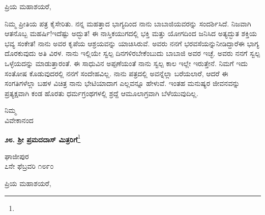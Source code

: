 \noindent
ಪ್ರಿಯ ಮಹಾಶಯರೆ,

ನಿಮ್ಮ ಪ್ರೀತಿಯ ಪತ್ರ ಕೈಸೇರಿತು. ನನ್ನ ಮಹತ್ತಾದ ಭಾಗ್ಯದಿಂದ ನಾನು ಬಾಬಾಜಿಯವರನ್ನು ಸಂದರ್ಶಿಸಿದೆ. ನಿಜವಾಗಿ ಆತನೊಬ್ಬ ಮಹರ್ಷಿ!ಇದೆಷ್ಟು ಅದ್ಭುತ! ಈ ನಾಸ್ತಿಕಯುಗದಲ್ಲಿ ಭಕ್ತಿ ಮತ್ತು ಯೋಗದಿಂದ ಜನಿಸಿದ ಅತ್ಯದ್ಭುತ ಶಕ್ತಿಯ ಭವ್ಯ ಸಂಕೇತ! ನಾನು ಅವರ ಕೃಪೆಯ ಆಶ್ರಯವನ್ನು ಯಾಚಿಸಿರುವೆ. ಅವರು ನನಗೆ ಭರವಸೆಯನ್ನು\break ನೀಡಿದ್ದಾರೆ\enginline{-}ಈ ಭಾಗ್ಯ ದೊರಕುವುದು ಅತಿ ವಿರಳ. ನಾನು ಇಲ್ಲಿಯೇ ಸ್ವಲ್ಪ ದಿನಗಳಿರಬೇಕೆಂಬುದು ಬಾಬಾಜಿ ಅವರ ಇಚ್ಛೆ. ಅವರು ನನಗೆ ಸ್ವಲ್ಪ ಒಳ್ಳೆಯದನ್ನು ಮಾಡುತ್ತಾರಂತೆ. ಈ ಸಾಧುವಿನ ಅಪ್ಪಣೆಯಂತೆ ನಾನು ಸ್ವಲ್ಪ ಕಾಲ ಇಲ್ಲೇ ಇರುತ್ತೇನೆ. ನಿಮಗೆ ಇದು ಸಂತೋಷ ಕೊಡುವುದರಲ್ಲಿ ನನಗೆ ಸಂದೇಹವಿಲ್ಲ. ನಾನು ಪತ್ರದಲ್ಲಿ ಅವನ್ನೆಲ್ಲಾ ಬರೆಯಲಾರೆ, ಆದರೆ ಈ ಸಂಗತಿಗಳೆಲ್ಲಾ ಬಹಳ ವಿಚಿತ್ರ \enginline{-} ನಾನು ಭೇಟಿಯಾದಾಗ ಎಲ್ಲವನ್ನೂ ಹೇಳುವೆ. ಇಂತಹ ಮನುಷ್ಯರ ಜೀವನವನ್ನು ಪ್ರತ್ಯಕ್ಷವಾಗಿ ಕಂಡ ಹೊರತು ಧರ್ಮಗ್ರಂಥಗಳಲ್ಲಿ ಶ್ರದ್ದೆ ಆಮೂಲಾಗ್ರವಾಗಿ ಬೆಳೆಯುವುದಿಲ್ಲ.

\vspace{-0.5cm}

{\flushright
ನಿಮ್ಮ\\ವಿವೇಕಾನಂದ\par}

\begin{center}
\textbf{೨೮. ಶ‍್ರೀ ಪ್ರಮದದಾಸ್ ಮಿತ್ರರಿಗೆ}\footnote{}
\end{center}

\vspace{-0.5cm}

\begin{flushright}
ಘಾಜೀಪುರ\\೭ನೇ ಫೆಬ್ರವರಿ ೧೮೯೦
\end{flushright}

\noindent
ಪ್ರಿಯ ಮಹಾಶಯರೆ,


